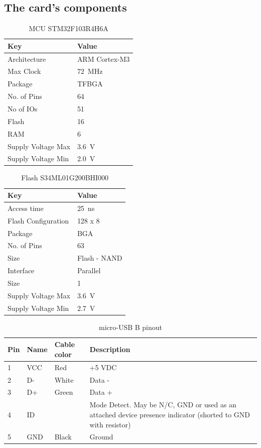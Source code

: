 \documentclass[final,a4paper]{report} %
\begin{document}
\subsection{The card's components}
\begin{table}[h]
	\centering
	\caption{MCU STM32F103R4H6A}
	\label{tab:mcu-specs}		
	\begin{tabular}{ll}
		\toprule		
		Key & Value \\
		\hline
		Architecture & ARM Cortex-M3 \\
		Max Clock & \SI{72}{\mega\hertz} \\
		Package & TFBGA \\
		No. of Pins & 64 \\
		No of IOs & 51 \\
		Flash & \SI{16}{\kibi\byte} \\
		RAM & \SI{6}{\kibi\byte} \\
		Supply Voltage Max & \SI{3.6}{\volt} \\
		Supply Voltage Min & \SI{2.0}{\volt} \\
		\bottomrule
	\end{tabular}
\end{table}

\begin{table}[h]
	\centering
	\caption{Flash S34ML01G200BHI000}
	\label{tab:flash-specs}
	\begin{tabular}{ll}
		\toprule		
		Key & Value \\
		\hline
		Access time & \SI{25}{\nano\second} \\
		Flash Configuration & 128\si{\mebi} x \SI{8}{\bit} \\
		Package & BGA \\
		No. of Pins & 63 \\
		Size & Flash - NAND \\	
		Interface & Parallel \\
		Size & \SI{1}{\gibi\bit} \\		
		Supply Voltage Max & \SI{3.6}{\volt} \\
		Supply Voltage Min & \SI{2.7}{\volt} \\
		\bottomrule
	\end{tabular}
\end{table}

\begin{table}[h]
	\centering
	\caption{micro-USB B pinout}
	\label{tab:microusb-pinout}		
	\begin{tabular}{lllp{6cm}}
		\toprule		
		Pin & Name & Cable color & Description\\
		\hline
		1 & VCC & Red & +5 VDC\\
		2 & D- & White & Data -\\
		3 & D+ & Green & Data +\\
		4 & ID &  & Mode Detect. May be N/C, GND or used as an attached device presence indicator (shorted to GND with resistor)\\
		5 & GND & Black & Ground\\
		\bottomrule
	\end{tabular}
\end{table}
\end{document}
